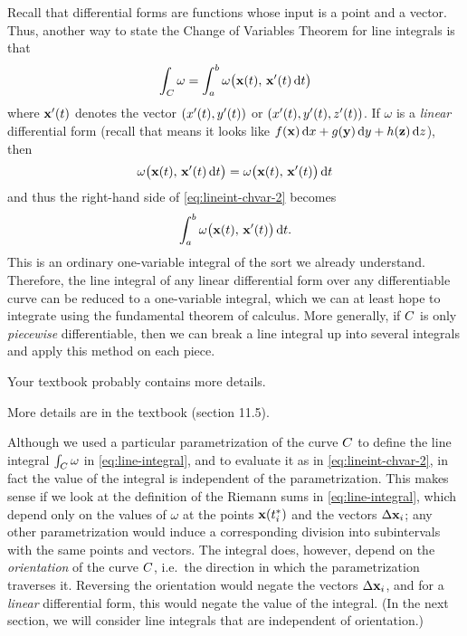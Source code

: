 \documentclass[12pt]{amsart}
\begin{document}
Recall that differential forms are functions whose input is a point and a vector.
Thus, another way to state the Change of Variables Theorem for line integrals is that
\begin{equation}
  \int_{C} \omega = \int_a^b \omega\big(\mathbf{x}(t),\, \mathbf{x}'(t) \,{\mathrm{d} t}\big)\label{eq:lineint-chvar-2}
\end{equation}
where $\mathbf{x}'(t)$ denotes the vector $(x'(t),y'(t))$ or $(x'(t),y'(t),z'(t))$.
If $\omega$ is a \emph{linear} differential form (recall that means it looks like $f(\mathbf{x})\,{\mathrm{d} x} + g(\mathbf{y})\,{\mathrm{d} y} + h(\mathbf{z})\,{\mathrm{d} z}$), then
\[ \omega\big(\mathbf{x}(t),\, \mathbf{x}'(t) \,{\mathrm{d} t}\big) = \omega\big(\mathbf{x}(t),\, \mathbf{x}'(t)\big)\,{\mathrm{d} t} \]
and thus the right-hand side of \cref{eq:lineint-chvar-2} becomes
\[ \int_a^b \omega\big(\mathbf{x}(t),\, \mathbf{x}'(t)\big)\,{\mathrm{d} t}. \]
This is an ordinary one-variable integral of the sort we already understand.
Therefore, the line integral of any linear differential form over any differentiable curve can be reduced to a one-variable integral, which we can at least hope to integrate using the fundamental theorem of calculus.
More generally, if $C$ is only \emph{piecewise} differentiable, then we can break a line integral up into several integrals and apply this method on each piece.
\begin{notextbook}Your textbook probably contains more details.\end{notextbook}
\begin{stewart}More details are in the textbook (section 11.5).\end{stewart}

\begin{rmk}\label{rmk:lineint-orientation}
  Although we used a particular parametrization of the curve $C$ to define the line integral $\int_{C} \omega$ in \cref{eq:line-integral}, and to evaluate it as in \cref{eq:lineint-chvar-2}, in fact the value of the integral is independent of the parametrization.
  This makes sense if we look at the definition of the Riemann sums in \cref{eq:line-integral}, which depend only on the values of $\omega$ at the points $\mathbf{x}({t}_{i}^*)$ and the vectors $\Delta \mathbf{x}_i$; any other parametrization would induce a corresponding division into subintervals with the same points and vectors.
  The integral does, however, depend on the \emph{orientation} of the curve $C$, i.e.\ the direction in which the parametrization traverses it.
  Reversing the orientation would negate the vectors $\Delta \mathbf{x}_i$, and for a \emph{linear} differential form, this would negate the value of the integral.
  (In the next section, we will consider line integrals that are independent of orientation.)
\end{rmk}
\end{document}
